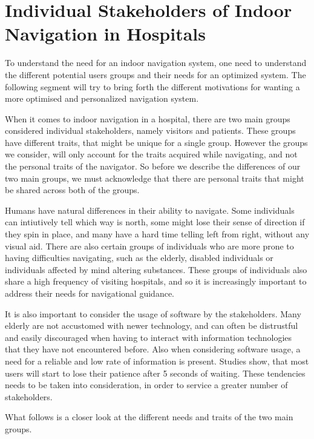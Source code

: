 \section{Individual Stakeholders of Indoor Navigation in Hospitals} %
\label{sec:interusers}

To understand the need for an indoor navigation system, one need to understand the different potential users groups and their needs for an optimized system. The following segment will try to bring forth the different motivations for wanting a more optimised and personalized navigation system.

When it comes to indoor navigation in a hospital, there are two main groups considered individual stakeholders, namely visitors and patients. These groups have different traits, that might be unique for a single group. However the groups we consider, will only account for the traits acquired while navigating, and not the personal traits of the navigator. So before we describe the differences of our two main groups, we must acknowledge that there are personal traits that might be shared across both of the groups.

Humans have natural differences in their ability to navigate. Some individuals can intiutively tell which way is north, some might lose their sense of direction if they spin in place, and many have a hard time telling left from right, without any visual aid\cite{naturtalenter}. There are also certain groups of individuals who are more prone to having difficulties navigating, such as the elderly, disabled individuals or individuals affected by mind altering substances\cite{MCI}. These groups of individuals also share a high frequency of visiting hospitals, and so it is increasingly important to address their needs for navigational guidance\cite{generel}.

It is also important to consider the usage of software by the stakeholders. Many elderly are not accustomed with newer technology, and can often be distrustful and easily discouraged when having to interact with information technologies that they have not encountered before\cite{gamle_teknologi}. Also when considering software usage, a need for a reliable and low rate of information is present. Studies show, that most users will start to lose their patience after 5 seconds of waiting\cite{ventetid}. These tendencies needs to be taken into consideration, in order to service a greater number of stakeholders.

What follows is a closer look at the different needs and traits of the two main groups.

